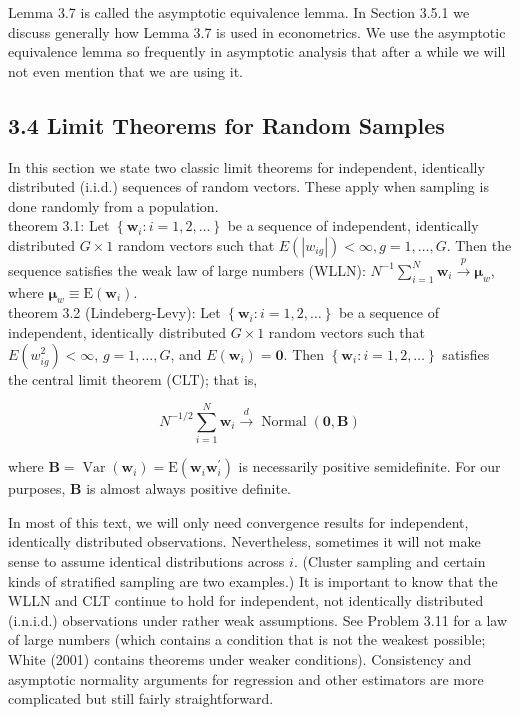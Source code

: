 \documentclass[10pt]{article}
\begin{document}
Lemma 3.7 is called the asymptotic equivalence lemma. In Section 3.5.1 we discuss generally how Lemma 3.7 is used in econometrics. We use the asymptotic equivalence lemma so frequently in asymptotic analysis that after a while we will not even mention that we are using it.

\subsection*{3.4 Limit Theorems for Random Samples}
In this section we state two classic limit theorems for independent, identically distributed (i.i.d.) sequences of random vectors. These apply when sampling is done randomly from a population.\\
theorem 3.1: Let $\left\{\mathbf{w}_{i}: i=1,2, \ldots\right\}$ be a sequence of independent, identically distributed $G \times 1$ random vectors such that $E\left(\left|w_{i g}\right|\right)<\infty, g=1, \ldots, G$. Then the sequence satisfies the weak law of large numbers (WLLN): $N^{-1} \sum_{i=1}^{N} \mathbf{w}_{i} \xrightarrow{p} \boldsymbol{\mu}_{w}$, where $\boldsymbol{\mu}_{w} \equiv \mathrm{E}\left(\mathbf{w}_{i}\right)$.\\
theorem 3.2 (Lindeberg-Levy): Let $\left\{\mathbf{w}_{i}: i=1,2, \ldots\right\}$ be a sequence of independent, identically distributed $G \times 1$ random vectors such that $E\left(w_{i g}^{2}\right)<\infty$, $g=1, \ldots, G$, and $E\left(\mathbf{w}_{i}\right)=\mathbf{0}$. Then $\left\{\mathbf{w}_{i}: i=1,2, \ldots\right\}$ satisfies the central limit theorem (CLT); that is,

$$
N^{-1 / 2} \sum_{i=1}^{N} \mathbf{w}_{i} \xrightarrow{d} \operatorname{Normal}(\mathbf{0}, \mathbf{B})
$$

where $\mathbf{B}=\operatorname{Var}\left(\mathbf{w}_{i}\right)=\mathrm{E}\left(\mathbf{w}_{i} \mathbf{w}_{i}^{\prime}\right)$ is necessarily positive semidefinite. For our purposes, $\mathbf{B}$ is almost always positive definite.

In most of this text, we will only need convergence results for independent, identically distributed observations. Nevertheless, sometimes it will not make sense to assume identical distributions across $i$. (Cluster sampling and certain kinds of stratified sampling are two examples.) It is important to know that the WLLN and CLT continue to hold for independent, not identically distributed (i.n.i.d.) observations under rather weak assumptions. See Problem 3.11 for a law of large numbers (which contains a condition that is not the weakest possible; White (2001) contains theorems under weaker conditions). Consistency and asymptotic normality arguments for regression and other estimators are more complicated but still fairly straightforward.
\end{document}
